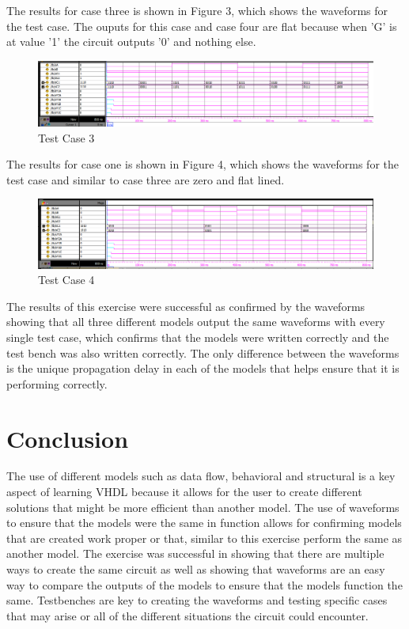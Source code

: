 \documentclass[CMPE]{KGCOEReport}
\begin{document}
The results for case three is shown in Figure 3, which shows the waveforms for the test case. The ouputs for this case and case four are flat because when 'G' is at value  '1' the circuit outputs '0' and nothing else.

\begin{figure}[H]
	\centering
	\includegraphics[width=1\textwidth]{ModelSimLab11PT3}
	\caption{Test Case 3}
	\label{fig:Figure 3}
\end{figure}

The results for case one is shown in Figure 4, which shows the waveforms for the test case and similar to case three are zero and flat lined.

\begin{figure}[H]
	\centering
	\includegraphics[width=1\textwidth]{ModelSimLab11PT4}
	\caption{Test Case 4}
	\label{fig:Figure 4}
\end{figure}

The results of this exercise were successful as confirmed by the waveforms showing that all three different models output the same waveforms with every single test case, which confirms that the models were written correctly and the test bench was also written correctly. The only difference between the waveforms is the unique propagation delay in each of the models that helps ensure that it is performing correctly.

\section*{Conclusion}
The use of different models such as data flow, behavioral and structural is a key aspect of learning VHDL because it allows for the user to create different solutions that might be more efficient than another model. The use of waveforms to ensure that the models were the same in function allows for confirming models that are created work proper or that, similar to this exercise perform the same as another model. The exercise was successful in showing that there are multiple ways to create the same circuit as well as showing that waveforms are an easy way to compare the outputs of the models to ensure that the models function the same. Testbenches are key to creating the waveforms and testing specific cases that may arise or all of the different situations the circuit could encounter.
\end{document}
